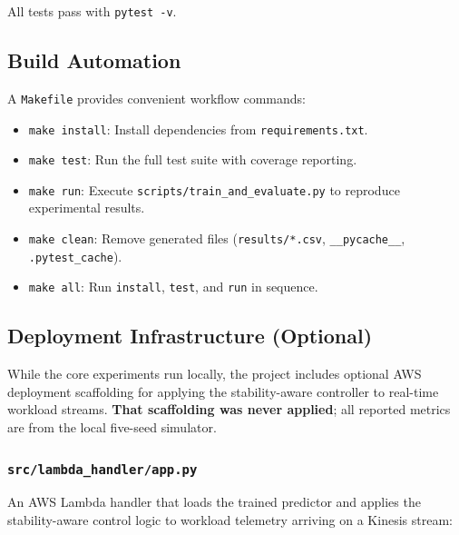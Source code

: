 All tests pass with \texttt{pytest -v}.

\subsection{Build Automation}

A \texttt{Makefile} provides convenient workflow commands:

\begin{itemize}
  \item \texttt{make install}: Install dependencies from \texttt{requirements.txt}.
  \item \texttt{make test}: Run the full test suite with coverage reporting.
  \item \texttt{make run}: Execute \texttt{scripts/train\_and\_evaluate.py} to reproduce experimental results.
  \item \texttt{make clean}: Remove generated files (\texttt{results/*.csv}, \texttt{\_\_pycache\_\_}, \texttt{.pytest\_cache}).
  \item \texttt{make all}: Run \texttt{install}, \texttt{test}, and \texttt{run} in sequence.
\end{itemize}

\subsection{Deployment Infrastructure (Optional)}

While the core experiments run locally, the project includes optional AWS deployment scaffolding for applying the stability-aware controller to real-time workload streams. \textbf{That scaffolding was never applied}; all reported metrics are from the local five-seed simulator.

\subsubsection{\texttt{src/lambda\_handler/app.py}}

An AWS Lambda handler that loads the trained predictor and applies the stability-aware control logic to workload telemetry arriving on a Kinesis stream:

